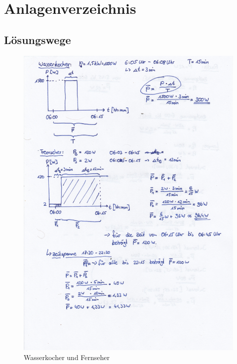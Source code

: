 \documentclass[12pt,a4paper]{scrartcl}
\begin{document}
\newpage
	
	\section{Anlagenverzeichnis}

	\subsection{Lösungswege}	

\begin{figure}[h]
 \centering
 \includegraphics[width=13cm]{src/bild1.jpg}
 \caption{Wasserkocher und Fernseher}
 \label{Wasserkocher und Fernseher}
\end{figure}

\newpage
\end{document}
